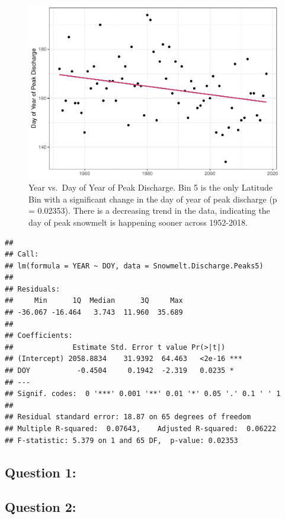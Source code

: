 \documentclass[12pt,]{article}
\begin{document}
\begin{figure}
\centering
\includegraphics{Project_Report_v2_files/figure-latex/unnamed-chunk-9-1.pdf}
\caption{Year vs.~Day of Year of Peak Discharge. Bin 5 is the only
Latitude Bin with a significant change in the day of year of peak
discharge (p = 0.02353). There is a decreasing trend in the data,
indicating the day of peak snowmelt is happening sooner across
1952-2018.}
\end{figure}

\begin{verbatim}
## 
## Call:
## lm(formula = YEAR ~ DOY, data = Snowmelt.Discharge.Peaks5)
## 
## Residuals:
##     Min      1Q  Median      3Q     Max 
## -36.067 -16.464   3.743  11.960  35.689 
## 
## Coefficients:
##              Estimate Std. Error t value Pr(>|t|)    
## (Intercept) 2058.8834    31.9392  64.463   <2e-16 ***
## DOY           -0.4504     0.1942  -2.319   0.0235 *  
## ---
## Signif. codes:  0 '***' 0.001 '**' 0.01 '*' 0.05 '.' 0.1 ' ' 1
## 
## Residual standard error: 18.87 on 65 degrees of freedom
## Multiple R-squared:  0.07643,    Adjusted R-squared:  0.06222 
## F-statistic: 5.379 on 1 and 65 DF,  p-value: 0.02353
\end{verbatim}

\hypertarget{question-1}{%
\subsection{Question 1: }\label{question-1}}

\hypertarget{question-2}{%
\subsection{Question 2:}\label{question-2}}
\end{document}
